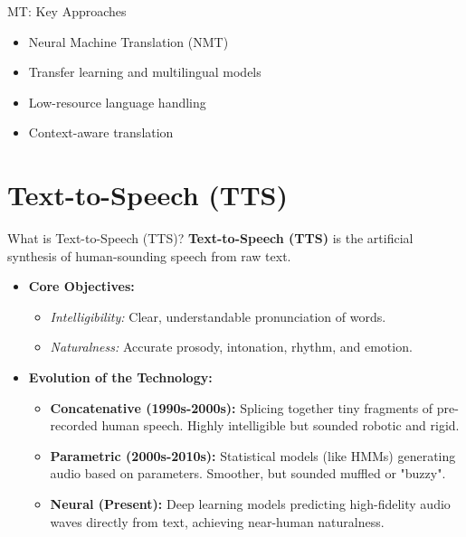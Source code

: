 \documentclass{beamer}
\begin{document}
\begin{frame}{MT: Key Approaches}
\begin{itemize}
\item Neural Machine Translation (NMT)
\item Transfer learning and multilingual models
\item Low-resource language handling
\item Context-aware translation
\end{itemize}
\end{frame}

\section{Text-to-Speech (TTS)}
\begin{frame}{What is Text-to-Speech (TTS)?}
  \textbf{Text-to-Speech (TTS)} is the artificial synthesis of human-sounding speech from raw text.
  \vspace{0.5cm}
  
  \begin{itemize}
      \setlength\itemsep{1em}
      \item \textbf{Core Objectives:} 
      \begin{itemize}
          \item \textit{Intelligibility:} Clear, understandable pronunciation of words.
          \item \textit{Naturalness:} Accurate prosody, intonation, rhythm, and emotion.
      \end{itemize}
      
      \item \textbf{Evolution of the Technology:}
      \begin{itemize}
          \item \textbf{Concatenative (1990s-2000s):} Splicing together tiny fragments of pre-recorded human speech. Highly intelligible but sounded robotic and rigid.
          \item \textbf{Parametric (2000s-2010s):} Statistical models (like HMMs) generating audio based on parameters. Smoother, but sounded muffled or "buzzy".
          \item \textbf{Neural (Present):} Deep learning models predicting high-fidelity audio waves directly from text, achieving near-human naturalness.
      \end{itemize}
  \end{itemize}
\end{frame}
\end{document}
